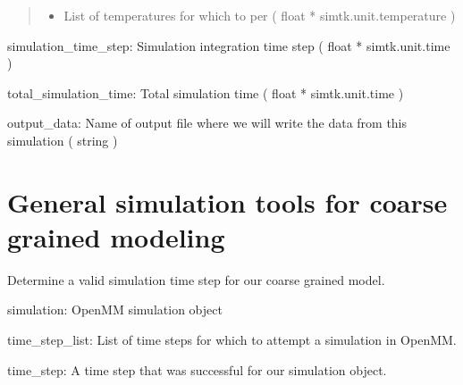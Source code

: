 \documentclass[letterpaper,12pt,english,openany,oneside]{sphinxmanual}
\begin{document}
\begin{fulllineitems}
\begin{quote}
\begin{description}
\begin{itemize}
\item {} 
 \textendash{} List of temperatures for which to per ( float * simtk.unit.temperature )

\end{itemize}

\end{description}\end{quote}

simulation\_time\_step: Simulation integration time step
( float * simtk.unit.time )

total\_simulation\_time: Total simulation time ( float * simtk.unit.time )

output\_data: Name of output file where we will write the data from this
simulation ( string )

\end{fulllineitems}



\section{General simulation tools for coarse grained modeling}
\label{\detokenize{simulation:module-simulation.tools}}\label{\detokenize{simulation:general-simulation-tools-for-coarse-grained-modeling}}

\begin{fulllineitems}
\label{\detokenize{simulation:simulation.tools.get_simulation_time_step}}
Determine a valid simulation time step for our coarse grained model.

simulation: OpenMM simulation object

time\_step\_list: List of time steps for which to attempt a simulation in OpenMM.

time\_step: A time step that was successful for our simulation object.

\end{fulllineitems}

\end{document}
